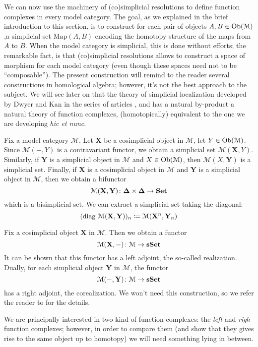 \begin{refsection}
We can now use the machinery of (co)simplicial resolutions to define function complexes in every model category. The goal, as we explained in the brief introduction to this section, is to construct for each pair of objects $A,B \in \operatorname{Ob}(\mathcal M)$,a simplicial set $\mathrm{Map}(A,B)$ encoding the homotopy structure of the maps from $A$ to $B$. When the model category is simplicial, this is done without efforts; the remarkable fact, is that (co)simplicial resolutions allows to construct a space of morphism for each model category (even though these spaces need not to be ``composable''). The present construction will remind to the reader several constructions in homological algebra; however, it's not the best approach to the subject. We will see later on that the theory of simplicial localization developed by Dwyer and Kan in the series of articles \cite{dksimplicial}, \cite{dkcomputing} and \cite{dkfunction} has a natural by-product a natural theory of function complexes, (homotopically) equivalent to the one we are developing \emph{hic et nunc}.

Fix a model category $\mathcal M$. Let $\mathbf{X}$ be a cosimplicial object in $\mathcal M$, let $Y \in \operatorname{Ob}(\mathcal M)$. Since $\mathcal M(-,Y)$ is a contravariant functor, we obtain a simplicial set $\mathcal M(\mathbf X,Y)$. Similarly, if $\mathbf Y$ is a simplicial object in $\mathcal M$ and $X \in \operatorname{Ob}(\mathcal M)$, then $\mathcal M(X,\mathbf Y)$ is a simplicial set. Finally, if $\mathbf X$ is a cosimplicial object in $\mathcal M$ and $\mathbf Y$ is a simplicial object in $\mathcal M$, then we obtain a bifunctor
\[
\mathcal M(\mathbf X,\mathbf Y) \colon \boldsymbol\Delta \times \boldsymbol\Delta \to \mathbf{Set}
\]
which is a bisimplicial set. We can extract a simplicial set taking the diagonal:
\[
(\operatorname{\mathrm{diag} \,} \mathcal M(\mathbf X,\mathbf Y))_n\coloneqq \mathcal M(\mathbf X^n,\mathbf Y_n)
\]

\begin{rmk}
Fix a cosimplicial object $\mathbf X$ in $\mathcal M$. Then we obtain a functor
\[
\mathcal M(\mathbf X, -) \colon \mathcal M \to \mathbf{s\,\!\mathbf{Set}}
\]
It can be shown that this functor has a left adjoint, the so-called realization. Dually, for each simplicial object $\mathbf Y$ in $\mathcal M$, the functor
\[
\mathcal M(-,\mathbf Y) \colon \mathcal M \to \mathbf{s\,\!\mathbf{Set}}
\]
has a right adjoint, the corealization. We won't need this construction, so we refer the reader to \cite[Ch. 16.3]{hirschhorn} for the details.
\end{rmk}

We are principally interested in two kind of function complexes: the \emph{left} and \emph{righ} function complexes; however, in order to compare them (and show that they gives rise to the same object up to homotopy) we will need something lying in between.


\end{refsection}
